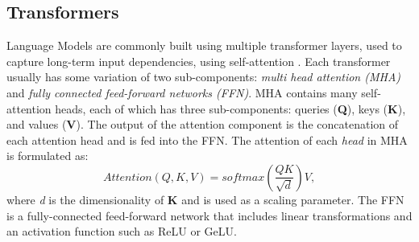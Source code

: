 \subsection{Transformers}
Language Models are commonly built using multiple transformer layers, used to capture long-term input dependencies, using self-attention \cite{Vaswani2017AttentionIA}. Each transformer usually has some variation of two sub-components: \textit{multi head attention (MHA)} and \textit{fully connected feed-forward networks (FFN)}. MHA contains many self-attention heads, each of which has three sub-components: queries (\textbf{Q}), keys (\textbf{K}), and values (\textbf{V}). The output of the attention component is the concatenation of each attention head and is fed into the FFN. 
The attention of each \textit{head} in MHA is formulated as:
\begin{equation}
 Attention(Q,K,V) = \textit{softmax} \left(\frac{QK}{\sqrt{\textit{d}}}\right)V,
 \end{equation}
\noindent where \textit{d} is the dimensionality of \textbf{K} and is used as a scaling parameter. 
The FFN is a fully-connected feed-forward network that includes linear transformations and an activation function such as ReLU or GeLU. 
